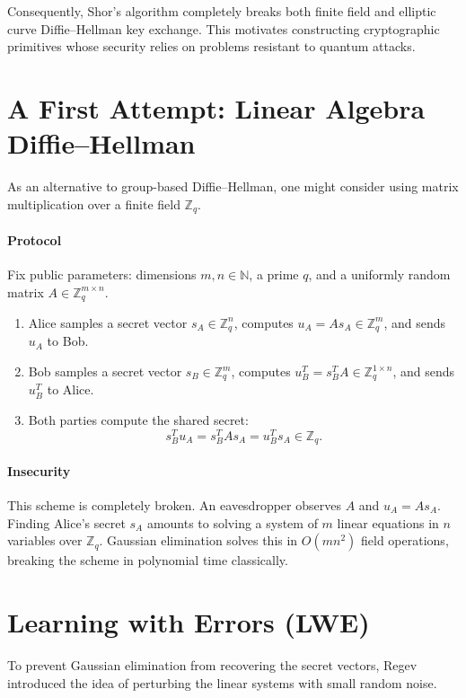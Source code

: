 Consequently, Shor's algorithm completely breaks both finite field and elliptic curve Diffie--Hellman key exchange.
This motivates constructing cryptographic primitives whose security relies on problems resistant to quantum attacks.

\section*{A First Attempt: Linear Algebra Diffie--Hellman}

As an alternative to group-based Diffie--Hellman, one might consider using matrix multiplication over a finite field \(\mathbb{Z}_q\).

\paragraph*{Protocol}
Fix public parameters: dimensions \(m, n \in \mathbb{N}\), a prime \(q\), and a uniformly random matrix \(A \in \mathbb{Z}_q^{m \times n}\).
\begin{enumerate}
    \item Alice samples a secret vector \(s_A \in \mathbb{Z}_q^n\), computes \(u_A = A s_A \in \mathbb{Z}_q^m\), and sends \(u_A\) to Bob.
    \item Bob samples a secret vector \(s_B \in \mathbb{Z}_q^m\), computes \(u_B^T = s_B^T A \in \mathbb{Z}_q^{1 \times n}\), and sends \(u_B^T\) to Alice.
    \item Both parties compute the shared secret:
    \[
        s_B^T u_A = s_B^T A s_A = u_B^T s_A \in \mathbb{Z}_q.
    \]
\end{enumerate}

\paragraph*{Insecurity}
This scheme is completely broken.
An eavesdropper observes \(A\) and \(u_A = A s_A\).
Finding Alice's secret \(s_A\) amounts to solving a system of \(m\) linear equations in \(n\) variables over \(\mathbb{Z}_q\).
Gaussian elimination solves this in \(O(m n^2)\) field operations, breaking the scheme in polynomial time classically.

\section*{Learning with Errors (LWE)}

To prevent Gaussian elimination from recovering the secret vectors, Regev~\cite{Regev2005} introduced the idea of perturbing the linear systems with small random noise.

